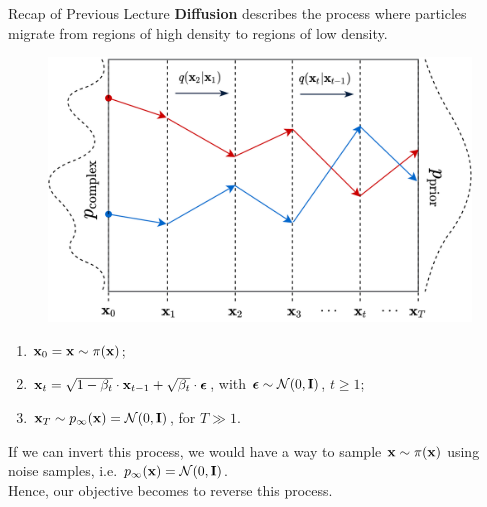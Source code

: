 \documentclass{beamer}
\begin{document}
\begin{frame}{Recap of Previous Lecture}
    \textbf{Diffusion} describes the process where particles migrate from regions of high density to regions of low density.
    \vspace{-0.2cm}
    \begin{figure}
        \includegraphics[width=0.5\linewidth]{figs/diffusion_over_time}
    \end{figure}
    \vspace{-0.6cm}
    \begin{enumerate}
        \item $\mathbf{x}_0 = \mathbf{x} \sim \pi(\mathbf{x})$;
        \item $\mathbf{x}_t = \sqrt{1 - \beta_t} \cdot \mathbf{x}_{t - 1} + \sqrt{\beta_t} \cdot \boldsymbol{\epsilon}$, with $\boldsymbol{\epsilon} \sim \mathcal{N}(0, \mathbf{I})$, $t \geq 1$;
        \item $\mathbf{x}_T \sim p_{\infty}(\mathbf{x}) = \mathcal{N}(0, \mathbf{I})$, for $T \gg 1$.
    \end{enumerate}
    If we can invert this process, we would have a way to sample $\mathbf{x} \sim \pi(\mathbf{x})$ using noise samples, i.e. $p_{\infty}(\mathbf{x}) = \mathcal{N}(0, \mathbf{I})$. \\ 
    Hence, our objective becomes to reverse this process.
\end{frame}
\end{document}
